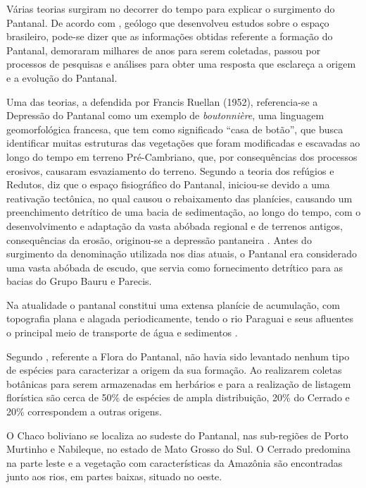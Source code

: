 		Várias teorias surgiram no decorrer do tempo para explicar o surgimento do Pantanal. De acordo com , geólogo que desenvolveu estudos sobre o espaço brasileiro, pode-se dizer que as informações obtidas referente a formação do Pantanal, demoraram milhares de anos para serem coletadas, passou por processos de pesquisas e análises para obter  uma resposta que esclareça a origem e a evolução do Pantanal.
		
		Uma das teorias, a defendida por Francis Ruellan (1952), referencia-se a Depressão  do Pantanal como um exemplo de \textit {boutonnière}, uma linguagem geomorfológica francesa, que tem como significado “casa de botão”, que busca identificar muitas estruturas das vegetações que foram modificadas e escavadas ao longo do tempo em terreno Pré-Cambriano, que, por consequências dos processos erosivos, causaram esvaziamento do terreno. Segundo a teoria dos refúgios e Redutos, diz que o espaço fisiográfico do Pantanal, iniciou-se devido a uma reativação tectônica, no qual causou o rebaixamento das planícies, causando um preenchimento detrítico de uma bacia de sedimentação, ao longo do tempo, com o desenvolvimento e adaptação da vasta abóbada regional e de terrenos antigos, consequências da erosão, originou-se a depressão pantaneira \cite{ab2006brasil}. Antes do surgimento da denominação utilizada nos dias atuais, o Pantanal era considerado uma vasta abóbada de escudo, que servia como fornecimento detrítico para as bacias do Grupo Bauru e Parecis.
		
		\begin{citacao}
			Na atualidade o pantanal constitui uma extensa planície de acumulação, com topografia plana e alagada periodicamente, tendo o rio Paraguai e seus afluentes o principal meio de transporte de água e sedimentos \cite{souza2006origem}.
		\end{citacao}
		
		Segundo , referente a Flora do Pantanal, não havia sido levantado nenhum tipo de espécies para caracterizar a origem da sua formação. Ao realizarem coletas botânicas para serem armazenadas em herbários e para a realização de listagem florística são cerca de 50\% de espécies de ampla distribuição, 20\% do Cerrado e 20\% correspondem a outras origens.
		
		O Chaco boliviano se localiza ao sudeste do Pantanal, nas sub-regiões de Porto Murtinho e Nabileque, no estado de Mato Grosso do Sul. O Cerrado predomina na parte leste e a vegetação com características da Amazônia são encontradas junto aos rios, em partes baixas, situado no oeste.
		
